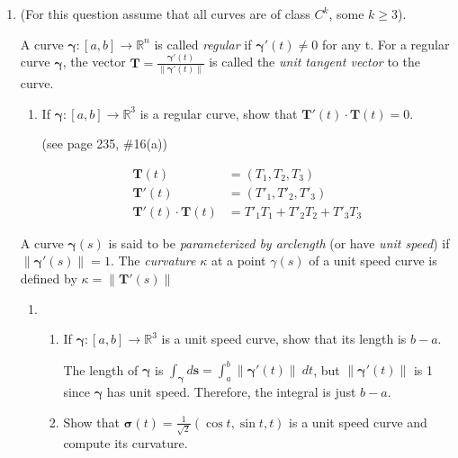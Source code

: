 \documentclass{article}
\newcommand{\norm}[1]{\| #1 \|}
\newcommand{\gam}{\boldsymbol{\gamma}}
\begin{document}
\thispagestyle{fancy}

\begin{enumerate}
    \item (For this question assume that all curves are of class $C^k$, some $k \geq 3$).

        A curve $\gam : [a,b] \rightarrow \mathbb{R}^n$ is called \textit{regular} if $\gam'(t) \not = 0$ for any t. For a regular curve $\gam$, the vector $\displaystyle \boldsymbol{T} = \frac{\gam ' (t)}{\norm{\gam '(t)}}$ is called the \textit{unit tangent vector} to the curve.
        \begin{enumerate}
            \item If $\gam : [a,b] \rightarrow \mathbb{R}^3$ is a regular curve, show that $\boldsymbol{T}'(t) \cdot \boldsymbol{T}(t) = 0$.

                (see page 235, \#16(a))

                \begin{align*}
                    \boldsymbol{T}(t) &= (T_1, T_2, T_3) \\
                    \boldsymbol{T}'(t) &= (T'_1, T'_2, T'_3) \\
                    \boldsymbol{T}'(t) \cdot \boldsymbol{T}(t) &= T'_1T_1 + T'_2 T_2 + T'_3 T_3
                \end{align*}
        \end{enumerate}
        A curve $\gam (s)$ is said to be \textit{parameterized by arclength} (or have \textit{unit speed}) if $\norm{\gam '(s)} = 1$. The \textit{curvature} $\kappa$ at a point $\gamma(s)$ of a unit speed curve is defined by $\kappa = \norm{\boldsymbol{T}'(s)}$
        \begin{enumerate}[resume]
            \item
                \begin{enumerate}[label=(\roman*)]
                    \item If $\gam : [a,b] \rightarrow \mathbb{R}^3$ is a unit speed curve, show that its length is $b - a$.

                        The length of $\gam$ is $\displaystyle \int_{\gam} d \boldsymbol{s} = \int_a^b \norm{\gam ' (t)} \ dt$, but $\norm{\gam ' (t)}$ is 1 since $\gam$ has unit speed. Therefore, the integral is just $b-a$.

                    \item Show that $\boldsymbol{\sigma}(t) = \frac{1}{\sqrt{2}}(\cos t, \sin t, t)$ is a unit speed curve and compute its curvature.
                        

\end{enumerate}
\end{enumerate}
\end{enumerate}
\end{document}
